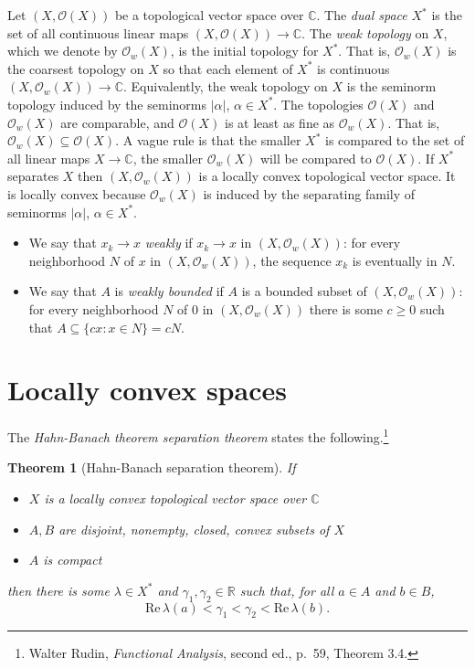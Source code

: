 \documentclass{article}
\def\Re{\ensuremath{\mathrm{Re}}\,}
\newtheorem{theorem}{Theorem}
\begin{document}
Let $(X,\mathcal{O}(X))$ be a topological vector space over $\mathbb{C}$. The {\em dual space} $X^*$ is the set of all continuous linear maps
$(X,\mathcal{O}(X)) \to \mathbb{C}$. 
The {\em weak topology} on $X$, which we denote by $\mathcal{O}_w(X)$, is the initial topology for $X^*$. That is, $\mathcal{O}_w(X)$ is the coarsest topology on $X$ so that each element of
$X^*$ is continuous $(X,\mathcal{O}_w(X)) \to \mathbb{C}$. 
Equivalently, the weak topology on $X$ is the seminorm topology induced by the seminorms $|\alpha|$, $\alpha \in X^*$.
The topologies $\mathcal{O}(X)$ and $\mathcal{O}_w(X)$ are comparable, and $\mathcal{O}(X)$ is at least as fine as $\mathcal{O}_w(X)$. 
That is, $\mathcal{O}_w(X) \subseteq \mathcal{O}(X)$. 
A vague rule is that
the smaller $X^*$ is compared to the set of all linear maps $X \to \mathbb{C}$, the smaller $\mathcal{O}_w(X)$ will be compared to $\mathcal{O}(X)$.
If $X^*$ separates $X$
 then $(X,\mathcal{O}_w(X))$ is a locally convex topological vector space. It is locally convex because $\mathcal{O}_w(X)$ is induced by the separating family
of seminorms $|\alpha|$, $\alpha  \in X^*$.


\begin{itemize}
\item We say that $x_k \to x$ {\em weakly} if $x_k \to x$ in $(X,\mathcal{O}_w(X))$: 
for every  neighborhood $N$ of $x$ in $(X,\mathcal{O}_w(X))$, the sequence $x_k$ is eventually in $N$.
\item We say that $A$ is {\em weakly bounded} if $A$ is a bounded subset of $(X,\mathcal{O}_w(X))$:
for every neighborhood $N$ of $0$ in $(X,\mathcal{O}_w(X))$ there is some $c \geq 0$ such that $A \subseteq \{c x: x \in N\}=c
N$.
\end{itemize}


\section{Locally convex spaces}
The {\em Hahn-Banach theorem separation theorem}
 states the following.\footnote{Walter Rudin, {\em Functional Analysis}, second ed., p.~59, Theorem 3.4.}
 
 \begin{theorem}[Hahn-Banach separation theorem]
 If
 \begin{itemize}
 \item $X$ is a locally convex topological vector space over $\mathbb{C}$
 \item $A,B$ are disjoint, nonempty, closed, convex subsets of $X$
 \item $A$ is compact
 \end{itemize}
 then there is some $\lambda \in X^*$ and
$\gamma_1,\gamma_2 \in \mathbb{R}$ such that, for all $a \in A$ and $b \in B$,
\[
\Re \lambda(a) < \gamma_1<\gamma_2 < \Re \lambda(b).
\]
\label{hahnbanach}
\end{theorem}
\end{document}
